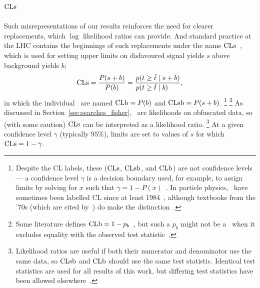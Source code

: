 \subsection{\texorpdfstring{$\mathrm{CLs}$}{CLs}}
Such misrepresentations of our results reinforces the need for clearer
replacements, which $\log$ likelihood ratios can provide.
And standard practice at the LHC contains the beginnings of such
replacements under the name $\mathrm{CLs}$~\cite{
read2000modified,
Read2002cls,
junk1999confidence,
read1997optimal,
bock1998lower,
etde1998prospects,
lep2000searches,
lep2003search,
Murray2010heretic,
cern2011procedure,
pdg2022ynf
},
which is used for setting upper limits on disfavoured signal yields $s$
above background yields $b$;
\begin{equation}
\label{eqn:searches_cls}
\cls
=
\frac{P(s + b)}{P(b)}
=
\frac{
\prob{t \geq \tilde{t}}{s + b}
}{
\prob{t \geq \tilde{t}}{b}\hfill
}
,
\end{equation}
in which the individual \pvalues\ are named
$\mathrm{CLb} = P(b)$ and
$\mathrm{CLsb} = P(s + b)$.%
\footnote{%
Despite the $\mathrm{CL}$ labels, these ($\mathrm{CLs}$, $\mathrm{CLsb}$, and $\mathrm{CLb}$) are
not confidence levels ---
a confidence level $\gamma$ is a decision boundary used, for example,
to assign limits by solving for $x$ such that
$\gamma = 1 - P(x)$~\cite{pdg1996}.
In particle physics, \pvalues\ have sometimes been labelled $\mathrm{CL}$ since
at least 1984~\cite{pdg1984}, although textbooks from the '70s (which are cited
by~\cite{pdg1984}) do make the distinction~\cite{
eadie1971statistical,
frodesen1979probability
}.%
}%
\footnote{%
Some literature defines $\mathrm{CLb} = 1 - p_b$~\cite{
Cowan:2010js,
pdg2022ynf
}, but such a $p_b$ might not be a \pvalue\ when it excludes equality with the
observed test statistic~\cite{cern2011procedure}.
}%
As discussed in Section~\ref{sec:searches_fisher}, \pvalues\ are likelihoods
on obfuscated data, so (with some caution) $\mathrm{CLs}$ can be interpreted as a
likelihood ratio.%
\footnote{%
Likelihood ratios are useful if both their numerator and denominator use the
same data, so $\mathrm{CLsb}$ and $\mathrm{CLb}$ should use the same test statistic.
Identical test statistics are used for all results of this work, but differing
test statistics have been allowed elsewhere~\cite{bock1998lower}.
}%
At a given confidence level $\gamma$ (typically $95\%$), limits are set to
values of $s$ for which $\mathrm{CLs} = 1 - \gamma$.

